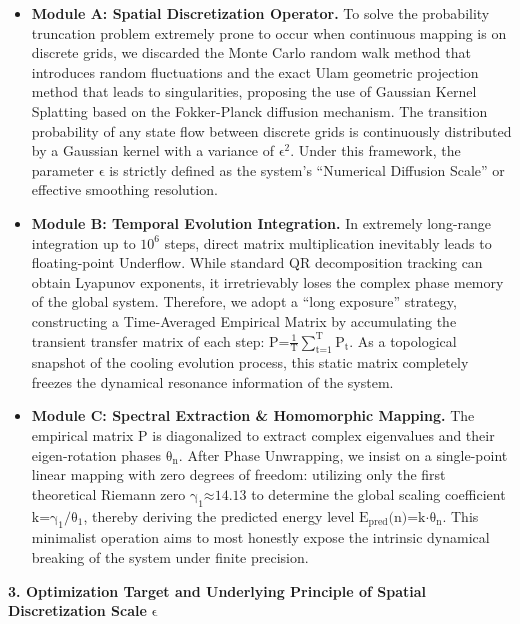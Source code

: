 \begin{itemize}
\item
  \textbf{Module A: Spatial Discretization Operator.} To solve the
  probability truncation problem extremely prone to occur when
  continuous mapping is on discrete grids, we discarded the Monte Carlo
  random walk method that introduces random fluctuations and the exact
  Ulam geometric projection method that leads to singularities,
  proposing the use of Gaussian Kernel Splatting based on the
  Fokker-Planck diffusion mechanism. The transition probability of any
  state flow between discrete grids is continuously distributed by a
  Gaussian kernel with a variance of \(\text{ϵ}^{\text{2}}\). Under this
  framework, the parameter \(\text{ϵ}\) is strictly defined as the
  system's ``Numerical Diffusion Scale'' or effective smoothing
  resolution.
\item
  \textbf{Module B: Temporal Evolution Integration.} In extremely
  long-range integration up to \(\text{10}^{\text{6}}\) steps, direct
  matrix multiplication inevitably leads to floating-point Underflow.
  While standard QR decomposition tracking can obtain Lyapunov
  exponents, it irretrievably loses the complex phase memory of the
  global system. Therefore, we adopt a ``long exposure'' strategy,
  constructing a Time-Averaged Empirical Matrix by accumulating the
  transient transfer matrix of each step:
  \(\text{P}\text{=}\frac{\text{1}}{\text{T}}\sum_{\text{t}\text{=1}}^{\text{T}}\text{P}_{\text{t}}\).
  As a topological snapshot of the cooling evolution process, this
  static matrix completely freezes the dynamical resonance information
  of the system.
\item
  \textbf{Module C: Spectral Extraction \& Homomorphic Mapping.} The
  empirical matrix \(\text{P}\) is diagonalized to extract complex
  eigenvalues and their eigen-rotation phases \(\text{θ}_{\text{n}}\).
  After Phase Unwrapping, we insist on a single-point linear mapping
  with zero degrees of freedom: utilizing only the first theoretical
  Riemann zero \(\text{γ}_{\text{1}}\text{≈14.13}\) to determine the
  global scaling coefficient
  \(\text{k}\text{=}\text{γ}_{\text{1}}\text{/}\text{θ}_{\text{1}}\),
  thereby deriving the predicted energy level
  \(\text{E}_{\text{pred}}\text{(}\text{n}\text{)=}\text{k}\text{⋅}\text{θ}_{\text{n}}\).
  This minimalist operation aims to most honestly expose the intrinsic
  dynamical breaking of the system under finite precision.
\end{itemize}

\textbf{3. Optimization Target and Underlying Principle of Spatial
Discretization Scale} \(\text{ϵ}\)

